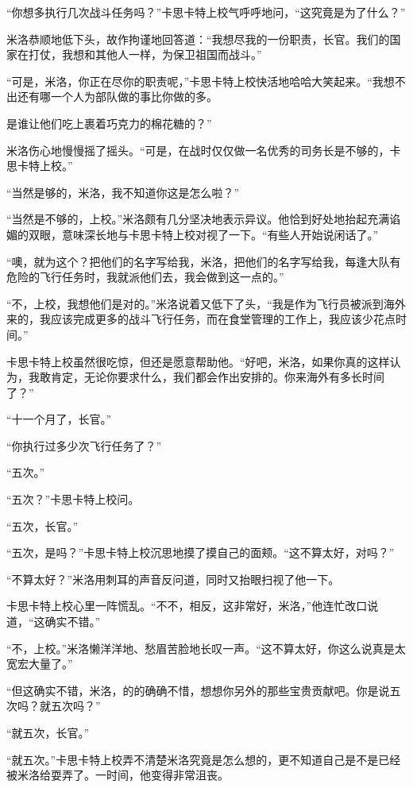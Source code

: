     “你想多执行几次战斗任务吗？”卡思卡特上校气呼呼地问，“这究竟是为了什么？”

    米洛恭顺地低下头，故作拘谨地回答道：“我想尽我的一份职责，长官。我们的国家在打仗，我想和其他人一样，为保卫祖国而战斗。”

    “可是，米洛，你正在尽你的职责呢，”卡思卡特上校快活地哈哈大笑起来。“我想不出还有哪一个人为部队做的事比你做的多。

    是谁让他们吃上裹着巧克力的棉花糖的？”

    米洛伤心地慢慢摇了摇头。“可是，在战时仅仅做一名优秀的司务长是不够的，卡思卡特上校。”

    “当然是够的，米洛，我不知道你这是怎么啦？”

    “当然是不够的，上校。”米洛颇有几分坚决地表示异议。他恰到好处地抬起充满谄媚的双眼，意味深长地与卡思卡特上校对视了一下。“有些人开始说闲话了。”

    “噢，就为这个？把他们的名字写给我，米洛，把他们的名字写给我，每逢大队有危险的飞行任务时，我就派他们去，我会做到这一点的。”

 


    “不，上校，我想他们是对的。”米洛说着又低下了头，“我是作为飞行员被派到海外来的，我应该完成更多的战斗飞行任务，而在食堂管理的工作上，我应该少花点时间。”

    卡思卡特上校虽然很吃惊，但还是愿意帮助他。“好吧，米洛，如果你真的这样认为，我敢肯定，无论你要求什么，我们都会作出安排的。你来海外有多长时间了？”

    “十一个月了，长官。”

    “你执行过多少次飞行任务了？”

    “五次。”

    “五次？”卡思卡特上校问。

    “五次，长官。”

    “五次，是吗？”卡思卡特上校沉思地摸了摸自己的面颊。“这不算太好，对吗？”

    “不算太好？”米洛用刺耳的声音反问道，同时又抬眼扫视了他一下。

    卡思卡特上校心里一阵慌乱。“不不，相反，这非常好，米洛，”他连忙改口说道，“这确实不错。”

    “不，上校。”米洛懒洋洋地、愁眉苦脸地长叹一声。“这不算太好，你这么说真是太宽宏大量了。”

    “但这确实不错，米洛，的的确确不惜，想想你另外的那些宝贵贡献吧。你是说五次吗？就五次吗？”

    “就五次，长官。”

    “就五次。”卡思卡特上校弄不清楚米洛究竟是怎么想的，更不知道自己是不是已经被米洛给耍弄了。一时间，他变得非常沮丧。

